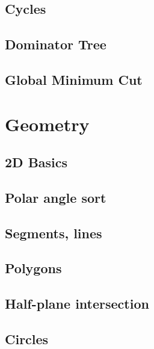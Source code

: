 \subsection{Cycles}
\raggedbottom
\hrulefill
\subsection{Dominator Tree}
\raggedbottom
\hrulefill
\subsection{Global Minimum Cut}
\raggedbottom
\hrulefill



\section{Geometry}
\subsection{2D Basics}
\raggedbottom
\hrulefill
\subsection{Polar angle sort}
\raggedbottom
\hrulefill
\subsection{Segments, lines}
\raggedbottom
\hrulefill
\subsection{Polygons}
\raggedbottom
\hrulefill
\subsection{Half-plane intersection}
\raggedbottom
\hrulefill
\subsection{Circles}
\raggedbottom
\hrulefill
